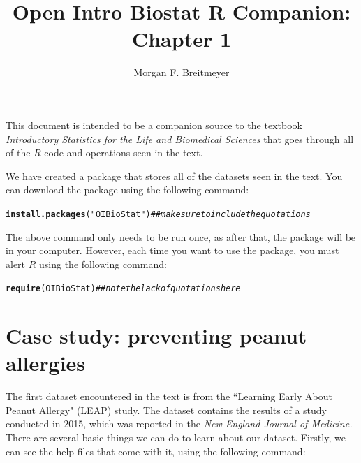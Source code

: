 \documentclass[11pt]{article}\usepackage[]{graphicx}\usepackage[]{color}
\title{Open Intro Biostat R Companion: \\ Chapter 1}
\author{Morgan F. Breitmeyer}
\date{}
\makeatletter
\newcommand{\hlstr}[1]{\textcolor[rgb]{0.192,0.494,0.8}{#1}}%
\newcommand{\hlcom}[1]{\textcolor[rgb]{0.678,0.584,0.686}{\textit{#1}}}%
\newcommand{\hlstd}[1]{\textcolor[rgb]{0.345,0.345,0.345}{#1}}%
\newcommand{\hlkwd}[1]{\textcolor[rgb]{0.737,0.353,0.396}{\textbf{#1}}}%
\newenvironment{kframe}{%
 \def\at@end@of@kframe{}%
 \ifinner\ifhmode%
  \def\at@end@of@kframe{\end{minipage}}%
  \begin{minipage}{\columnwidth}%
 \fi\fi%
 \def\FrameCommand##1{\hskip\@totalleftmargin \hskip-\fboxsep
 \colorbox{shadecolor}{##1}\hskip-\fboxsep
     \hskip-\linewidth \hskip-\@totalleftmargin \hskip\columnwidth}%
 \MakeFramed {\advance\hsize-\width
   \@totalleftmargin\z@ \linewidth\hsize
   \@setminipage}}%
 {\par\unskip\endMakeFramed%
 \at@end@of@kframe}
\newenvironment{knitrout}{}{} %
\makeatother
\begin{document}
\maketitle

\tableofcontents

\vspace{1cm}
This document is intended to be a companion source to the textbook \textit{Introductory Statistics for the Life and Biomedical Sciences} that goes through all of the $R$ code and operations seen in the text.

We have created a package that stores all of the datasets seen in the text.  You can download the package using the following command:
\begin{knitrout}
\color{fgcolor}\begin{kframe}
\begin{alltt}
\hlkwd{install.packages}\hlstd{(}\hlstr{"OIBioStat"}\hlstd{)}  \hlcom{## make sure to include the quotations}
\end{alltt}
\end{kframe}
\end{knitrout}

The above command only needs to be run once, as after that, the package will be in your computer.  However, each time you want to use the package, you must alert $R$ using the following command:
\begin{knitrout}
\color{fgcolor}\begin{kframe}
\begin{alltt}
\hlkwd{require}\hlstd{(OIBioStat)} \hlcom{## note the lack of quotations here}
\end{alltt}
\end{kframe}
\end{knitrout}

\section{Case study: preventing peanut allergies}

The first dataset encountered in the text is from the ``Learning Early About Peanut Allergy" (LEAP) study.  The dataset contains the results of a study conducted in 2015, which was reported in the \textit{New England Journal of Medicine.}  There are several basic things we can do to learn about our dataset.  Firstly, we can see the help files that come with it, using the following command:
\end{document}
